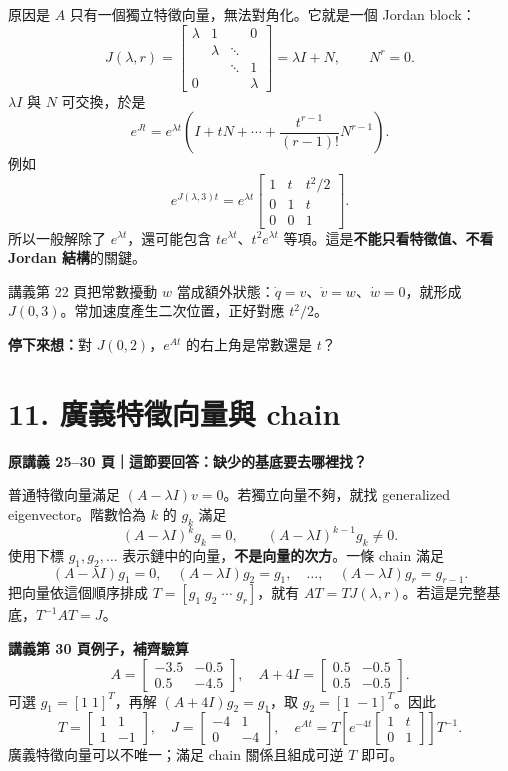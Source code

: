 \documentclass[12pt,a4paper]{article}
\newcommand{\topic}[3]{\clearpage\section*{#1}\textcolor{accent}{\textbf{原講義 #2 頁｜這節要回答：#3}}\par}
\newcommand{\checkq}[1]{\par\textbf{停下來想：}#1\par}
\begin{document}
原因是 $A$ 只有一個獨立特徵向量，無法對角化。它就是一個 Jordan block：
\[
 J(\lambda,r)=\begin{bmatrix}
 \lambda&1&&0\\&\lambda&\ddots&\\&&\ddots&1\\0&&&\lambda
 \end{bmatrix}=\lambda I+N,\qquad N^r=0.
\]
$\lambda I$ 與 $N$ 可交換，於是
\[
\boxed{e^{Jt}=e^{\lambda t}\left(I+tN+\cdots+
 \frac{t^{r-1}}{(r-1)!}N^{r-1}\right).}
\]
例如
\[
 e^{J(\lambda,3)t}=e^{\lambda t}
 \begin{bmatrix}1&t&t^2/2\\0&1&t\\0&0&1\end{bmatrix}.
\]
所以一般解除了 $e^{\lambda t}$，還可能包含 $te^{\lambda t}$、$t^2e^{\lambda t}$ 等項。這是\textbf{不能只看特徵值、不看 Jordan 結構}的關鍵。

講義第 22 頁把常數擾動 $w$ 當成額外狀態：$\dot q=v$、$\dot v=w$、$\dot w=0$，就形成 $J(0,3)$。常加速度產生二次位置，正好對應 $t^2/2$。
\checkq{對 $J(0,2)$，$e^{At}$ 的右上角是常數還是 $t$？}

\topic{11. 廣義特徵向量與 chain}{25--30}{缺少的基底要去哪裡找？}
普通特徵向量滿足 $(A-\lambda I)v=0$。若獨立向量不夠，就找 generalized eigenvector。階數恰為 $k$ 的 $g_k$ 滿足
\[
 (A-\lambda I)^kg_k=0,\qquad (A-\lambda I)^{k-1}g_k\ne0.
\]
使用下標 $g_1,g_2,\ldots$ 表示鏈中的向量，\textbf{不是向量的次方}。一條 chain 滿足
\[
 (A-\lambda I)g_1=0,\quad
 (A-\lambda I)g_2=g_1,\quad\ldots,\quad
 (A-\lambda I)g_r=g_{r-1}.
\]
把向量依這個順序排成 $T=[g_1\;g_2\;\cdots\;g_r]$，就有 $AT=TJ(\lambda,r)$。若這是完整基底，$T^{-1}AT=J$。

\textbf{講義第 30 頁例子，補齊驗算}
\[
 A=\begin{bmatrix}-3.5&-0.5\\0.5&-4.5\end{bmatrix},\quad
 A+4I=\begin{bmatrix}0.5&-0.5\\0.5&-0.5\end{bmatrix}.
\]
可選 $g_1=[1\;1]^T$，再解 $(A+4I)g_2=g_1$，取 $g_2=[1\;-1]^T$。因此
\[
 T=\begin{bmatrix}1&1\\1&-1\end{bmatrix},\quad
 J=\begin{bmatrix}-4&1\\0&-4\end{bmatrix},\quad
 e^{At}=T\left[e^{-4t}\begin{bmatrix}1&t\\0&1\end{bmatrix}\right]T^{-1}.
\]
廣義特徵向量可以不唯一；滿足 chain 關係且組成可逆 $T$ 即可。
\end{document}
